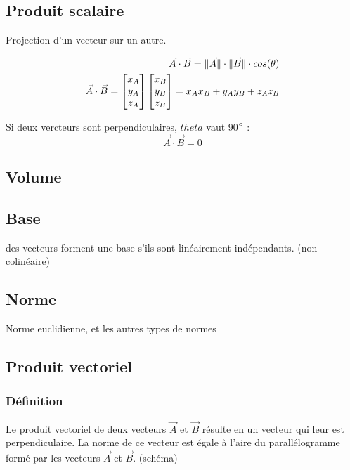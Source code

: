 \subsection{Produit scalaire}
Projection d'un vecteur sur un autre.

\begin{eqnarray}
\vec{A} \cdot \vec{B}=\lVert\vec{A}\rVert \cdot \lVert\vec{B}\rVert \cdot cos(\theta)\\
\vec{A} \cdot \vec{B}= 
\begin{bmatrix}
x_A \\
y_A\\
z_A
\end{bmatrix}
\begin{bmatrix}
x_B \\
y_B\\
z_B
\end{bmatrix}
=x_A x_B + y_A y_B + z_A z_B
\end{eqnarray}

Si deux vercteurs sont perpendiculaires, $theta$ vaut 90$\degree$ :
\begin{equation}
\vec{A} \cdot \vec{B}=0
\end{equation}

\subsection{Volume}
\subsection{Base}
des vecteurs forment une base s'ils sont linéairement indépendants. (non colinéaire)

\subsection{Norme}
Norme euclidienne, et les autres types de normes
\subsection{Produit vectoriel}

\subsubsection{Définition}
Le produit vectoriel de deux vecteurs $\vec{A}$ et $\vec{B}$ résulte en un vecteur qui leur est perpendiculaire. La norme de ce vecteur est égale à l'aire du parallélogramme formé par les vecteurs $\vec{A}$ et $\vec{B}$. (schéma)
